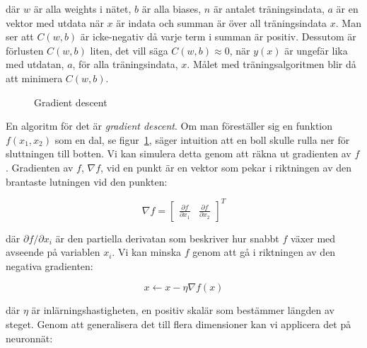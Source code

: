 där $ w $ är alla weights i nätet, $ b $ är alla biases,
$ n $ är antalet träningsindata, $ a $ är en vektor med utdata när $ x $ är indata
och summan är över all träningsindata $ x $.
Man ser att $ C(w, b) $ är icke-negativ då varje term i summan är positiv.
Dessutom är förlusten $ C(w, b) $ liten, det vill säga $ C(w, b) \approx 0 $,
när $ y(x) $ är ungefär lika med utdatan, $ a $, för alla träningsindata, $ x $.
Målet med träningsalgoritmen blir då att minimera $ C(w, b) $.

\begin{figure}
	\centering
	\caption{Gradient descent}
	\label{fig:descent}
\end{figure}

En algoritm för det är \emph{gradient descent}.
Om man föreställer sig en funktion $ f(x_1, x_2) $ som en dal,
se figur~\ref{fig:descent},
säger intuition att en boll skulle rulla ner för sluttningen till botten.
Vi kan simulera detta genom att räkna ut gradienten av $ f $.
Gradienten av $ f $, $ \nabla f $, vid en punkt är en vektor
som pekar i riktningen av den brantaste lutningen vid den punkten:

\begin{equation}
	\nabla f = \begin{bmatrix} \frac{\partial f}{\partial x_1} & \frac{\partial f}{\partial x_2} \end{bmatrix}^{T}
\end{equation}

där $ \partial f / \partial x_i $ är den partiella derivatan
som beskriver hur snabbt $ f $ växer med avseende på variablen $ x_i $.
Vi kan minska $ f $ genom att gå i riktningen av den negativa gradienten:

\begin{equation}
	x \leftarrow x - \eta \nabla f(x)
\end{equation}

där $ \eta $ är inlärningshastigheten,
en positiv skalär som bestämmer längden av steget.
Genom att generalisera det till flera dimensioner kan vi
applicera det på neuronnät:

